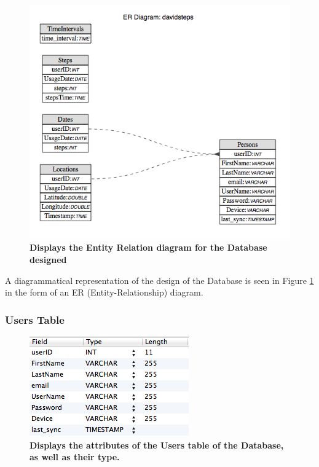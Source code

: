 \documentclass{l4proj}
\begin{document}
\begin{figure}[H]
\centering
\includegraphics[scale=0.5]{images/screenshots/erdiagram.png}
\caption{\textbf{Displays the Entity Relation diagram for the Database designed}}
\label{design:erdiagram}
\end{figure}

A diagrammatical representation of the design of the Database is seen in Figure \ref{design:erdiagram} in the form of an ER (Entity-Relationship) diagram.

\subsubsection{Users Table}

\begin{figure}[H]
\centering
\includegraphics[scale=1.0]{images/screenshots/usersscreen.png}
\caption{\textbf{Displays the attributes of the Users table of the Database, as well as their type.}}
\label{design:usersscreen}
\end{figure}
\end{document}
